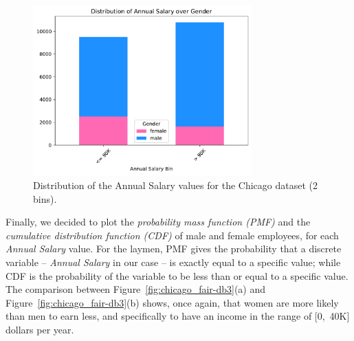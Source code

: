 \begin{itemize}
\begin{figure}[h!]
\centering
\includegraphics[width=0.75\textwidth]{figures/Chicago_2bins_annual_salary_over_gender.pdf}
\caption{Distribution of the \textrm{Annual Salary} values for the Chicago dataset (2 bins).}
\label{fig:chicago_fair-db2}
\end{figure}

Finally, we decided to plot the \textit{probability mass function (PMF)} and the \textit{cumulative distribution function (CDF)} of male and female employees, for each \textit{Annual Salary} value. For the laymen, PMF gives the probability that a discrete variable -- \textit{Annual Salary} in our case -- is exactly equal to a specific value; while CDF is the probability of the variable to be less than or equal to a specific value. The comparison between Figure~\ref{fig:chicago_fair-db3}(a) and Figure~\ref{fig:chicago_fair-db3}(b) shows, once again, that women are more likely than men to earn less, and specifically to have an income in the range of [0,~40K] dollars per year.


\end{itemize}
